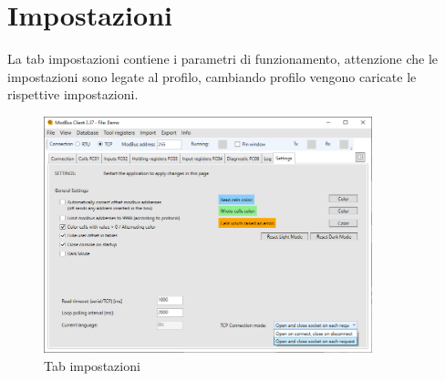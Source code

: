 
\chapter{Impostazioni}

La tab impostazioni contiene i parametri di funzionamento,
attenzione che le impostazioni sono legate al profilo,
cambiando profilo vengono caricate le rispettive impostazioni.

\begin{figure}[H]
    \centering
    \includegraphics[width=0.85\textwidth]{../Img/Modbus_Client_Settings_00.PNG}
    \caption{Tab impostazioni}
\end{figure}

